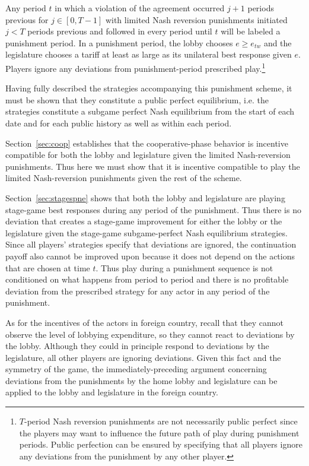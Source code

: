 \documentclass[authoryear, review]{elsarticle}
\begin{document}
Any period $t$ in which a violation of the agreement occurred $j+1$ periods previous for $j \in [0,T-1]$ with limited Nash reversion punishments initiated $j<T$ periods previous and followed in every period until $t$ will be labeled a punishment period. In a punishment period, the lobby chooses $e \geq e_{tw}$ and the legislature chooses a tariff at least as large as its unilateral best response given $e$. Players ignore any deviations from punishment-period prescribed play.\footnote{$T$-period Nash reversion punishments are not necessarily public perfect since the players may want to influence the future path of play during punishment periods. Public perfection can be ensured by specifying that all players ignore any deviations from the punishment by any other player.}

Having fully described the strategies accompanying this punishment scheme, it must be shown that they constitute a public perfect equilibrium, i.e. the strategies constitute a subgame perfect Nash equilibrium from the start of each date and for each public history as well as within each period.
		
Section~\ref{sec:coop} establishes that the cooperative-phase behavior is incentive compatible for both the lobby and legislature given the limited Nash-reversion punishments. Thus here we must show that it is incentive compatible to play the limited Nash-reversion punishments given the rest of the scheme.

Section~\ref{sec:stagespne} shows that both the lobby and legislature are playing stage-game best responses during any period of the punishment. Thus there is no deviation that creates a stage-game improvement for either the lobby or the legislature given the stage-game subgame-perfect Nash equilibrium strategies. Since all players' strategies specify that deviations are ignored, the continuation payoff also cannot be improved upon because it does not depend on the actions that are chosen at time $t$. Thus play during a punishment sequence is not conditioned on what happens from period to period and there is no profitable deviation from the prescribed strategy for any actor in any period of the punishment.

As for the incentives of the actors in foreign country, recall that they cannot observe the level of lobbying expenditure, so they cannot react to deviations by the lobby. Although they could in principle respond to deviations by the legislature, all other players are ignoring deviations. Given this fact and the symmetry of the game, the immediately-preceding argument concerning deviations from the punishments by the home lobby and legislature can be applied to the lobby and legislature in the foreign country.
\end{document}
